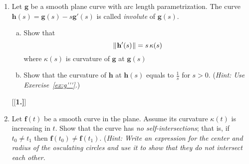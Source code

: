 \begin{enumerate}[\bfseries 1.]
  \item Let $\mathbf{g}$ be a smooth plane curve with arc length parametrization.
  The curve $\mathbf{h}(s)=\mathbf{g}(s)-s\mathbf{g}'(s)$ is called \emph{involute} of $\mathbf{g}(s)$.
  \begin{enumerate}[(a)]
  \item Show that 
  \[\lVert\mspace{1mu}\mathbf{h}'(s)\mspace{1mu}\rVert=s\,\kappa(s)\] 
  where $\kappa(s)$ is curvature of $\mathbf{g}$ at $\mathbf{g}(s)$
  \item Show that the curvature of $\mathbf{h}$ at $\mathbf{h}(s)$ equals to $\tfrac1s$ for $s>0$. (\emph{Hint: Use Exercise~\ref{ex:g'''}.})
  \end{enumerate}
[{[\bfseries 1.]}]
   \item Let $\mathbf{f}(t)$ be a smooth curve in the plane.
   Assume its curvature $\kappa(t)$ is increasing in $t$.
   Show that the curve has \emph{no self-intersections};
   that is, if $t_0\ne t_1$ then $\mathbf{f}(t_0)\ne\mathbf{f}(t_1)$.
   (\textit{Hint: Write an expression for the center and radius of the osculating circles and use it to show that they do not intersect each other.}
\end{enumerate}

